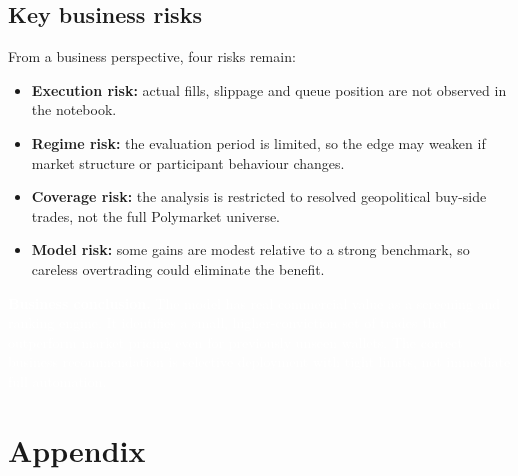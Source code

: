\documentclass[11pt,a4paper]{article}
\begin{document}
\subsection{Key business risks}

From a business perspective, four risks remain:
\begin{itemize}[label=--]
    \item \textbf{Execution risk:} actual fills, slippage and queue position are not observed in the notebook.
    \item \textbf{Regime risk:} the evaluation period is limited, so the edge may weaken if market structure or participant behaviour changes.
    \item \textbf{Coverage risk:} the analysis is restricted to resolved geopolitical buy-side trades, not the full Polymarket universe.
    \item \textbf{Model risk:} some gains are modest relative to a strong benchmark, so careless overtrading could eliminate the benefit.
\end{itemize}

\begin{mdframed}[linewidth=0.6pt, backgroundcolor=ucdblue]
\vspace{0.75em}
\textcolor{white}{\textbf{Business conclusion.} The model has real commercial value as a screening and ranking engine. It identifies a small, higher-conviction set of trades that outperform market pricing even for previously unseen wallets. The correct business recommendation is selective deployment with tight limits, not immediate full automation.}
\vspace{0.75em}
\end{mdframed}

\newpage
\appendix
\section{Appendix}
\end{document}
